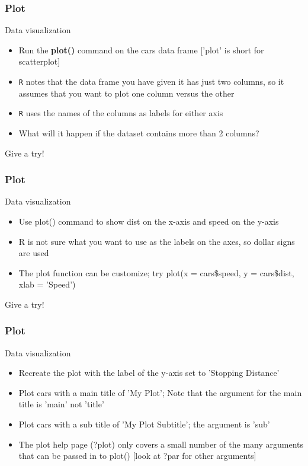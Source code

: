 \documentclass{beamer}
\begin{document}
\begin{frame}[fragile]
	\frametitle{Plot}
	\centering \Large Data visualization
	\begin{itemize}
		\small
		\item Run the \textbf{plot()} command on the cars data frame \tiny ['plot' is short for scatterplot] \small
		\vspace{10pt}
		\pause
		\item \texttt{R} notes that the data frame you have given it has just two columns, so it assumes that you want to plot one column versus the other
		\item \texttt{R} uses the names of the columns as labels for either axis
		\vspace{10pt}
		\pause
		\item What will it happen if the dataset contains more than 2 columns?
	\end{itemize}
	
	\vspace{20pt}
	\begin{center} Give a try! \end{center}

\end{frame}



\begin{frame}[fragile]
	\frametitle{Plot}
	\centering \Large Data visualization
	\begin{itemize}
		\small
		\item Use plot() command to show dist on the x-axis and speed on the y-axis
	\pause
		\item R is not sure what you want to use as the labels on the axes, so dollar signs are used
		\item The plot function can be customize; try plot(x = cars\$speed, y = cars\$dist, xlab = 'Speed') 
	\end{itemize}
	
	\vspace{20pt}
	\begin{center} Give a try! \end{center}
\end{frame}

\begin{frame}[fragile]
	\frametitle{Plot}
	\centering \Large Data visualization
	\begin{itemize}
		\small
		\item Recreate the plot with the label of the y-axis set to 'Stopping Distance' 
	\pause
		\item Plot cars with a main title of 'My Plot'; Note that the argument for the main title is 'main' not 'title'
	\pause
		\item Plot cars with a sub title of 'My Plot Subtitle'; the argument is 'sub'
	\pause
		\item The plot help page (?plot) only covers a small number of the many arguments that can be passed in to plot() [look at ?par for other arguments]
	\end{itemize}
\end{frame}
\end{document}
